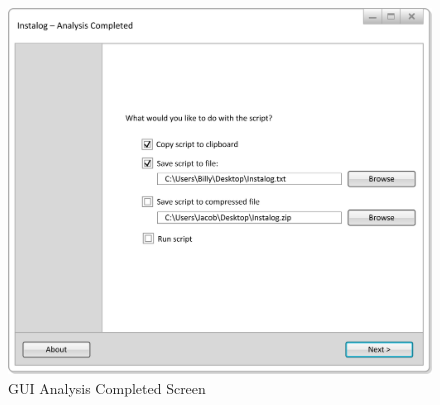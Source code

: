 \begin{figure}[!ht]
  	\centering
	\includegraphics{figures/gui/Analysis_Completed.png}
  	\caption{GUI Analysis Completed Screen}
  	\label{fig:gui_analysis_completed}
\end{figure}

